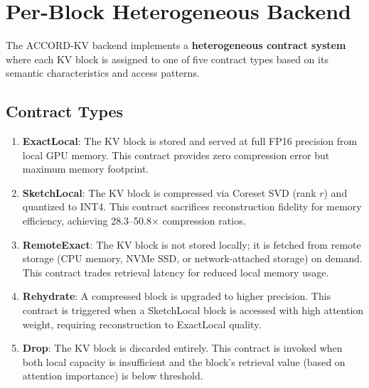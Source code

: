 \documentclass[11pt, a4paper, oneside]{article}
\theoremstyle{myplain}
\theoremstyle{mydefinition}
\theoremstyle{myremark}
\begin{document}
\section{Per-Block Heterogeneous Backend}

The ACCORD-KV backend implements a \textbf{heterogeneous contract system} where each KV block is assigned to one of five contract types based on its semantic characteristics and access patterns.

\subsection{Contract Types}

\begin{enumerate}
    \item \textbf{ExactLocal}: The KV block is stored and served at full FP16 precision from local GPU memory. This contract provides zero compression error but maximum memory footprint.
    
    \item \textbf{SketchLocal}: The KV block is compressed via Coreset SVD (rank $r$) and quantized to INT4. This contract sacrifices reconstruction fidelity for memory efficiency, achieving 28.3--50.8$\times$ compression ratios.
    
    \item \textbf{RemoteExact}: The KV block is not stored locally; it is fetched from remote storage (CPU memory, NVMe SSD, or network-attached storage) on demand. This contract trades retrieval latency for reduced local memory usage.
    
    \item \textbf{Rehydrate}: A compressed block is upgraded to higher precision. This contract is triggered when a SketchLocal block is accessed with high attention weight, requiring reconstruction to ExactLocal quality.
    
    \item \textbf{Drop}: The KV block is discarded entirely. This contract is invoked when both local capacity is insufficient and the block's retrieval value (based on attention importance) is below threshold.
\end{enumerate}
\end{document}
